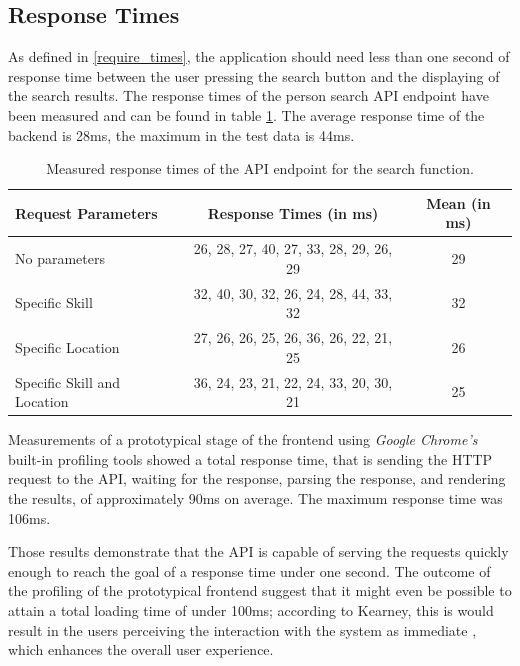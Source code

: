 \subsection{Response Times}
\label{resptime}
As defined in \ref{require_times}, the application should need less than one second of response time between the user pressing the search button and the
displaying of the search results. The response times of the person search API endpoint have been measured and can be found in table \ref{tab:responsetimes}.
The average response time of the backend is 28ms, the maximum in the test data is 44ms.

\begin{table}[H]
\centering
  \begin{tabular}{l|c|c|}
		Request Parameters                    & Response Times (in ms)                & Mean (in ms)\\
		\hline
		No parameters               & 26, 28, 27, 40, 27, 33, 28, 29, 26, 29 & 29\\
		Specific Skill              & 32, 40, 30, 32, 26, 24, 28, 44, 33, 32 & 32\\
		Specific Location           & 27, 26, 26, 25, 26, 36, 26, 22, 21, 25 & 26\\
		Specific Skill and Location & 36, 24, 23, 21, 22, 24, 33, 20, 30, 21 & 25\\
  \end{tabular}

\caption[API Response Times]{Measured response times of the API endpoint for the search function.}
\label{tab:responsetimes}
\end{table}

Measurements of a prototypical stage of the frontend using \textit{Google Chrome's} built-in profiling tools showed a total response time, that is sending the HTTP request to the API, waiting for the response, parsing the response, and rendering the results, of approximately 90ms on average. The maximum response time was 106ms.

Those results demonstrate that the API is capable of serving the requests quickly enough to reach the goal of a response time under one second. The outcome of the profiling of the prototypical frontend suggest that it might even be possible to attain a total loading time of under 100ms; according to Kearney, this is would result in the users perceiving the interaction with the system as immediate \cite{RAIL}, which enhances the overall user experience.

